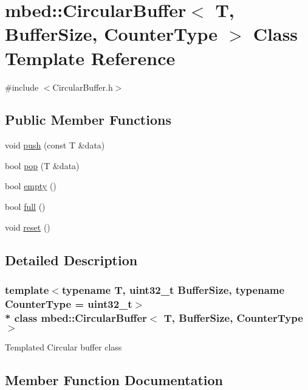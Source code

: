 \hypertarget{classmbed_1_1_circular_buffer}{}\section{mbed\+:\+:Circular\+Buffer$<$ T, Buffer\+Size, Counter\+Type $>$ Class Template Reference}
\label{classmbed_1_1_circular_buffer}


{\ttfamily \#include $<$Circular\+Buffer.\+h$>$}

\subsection*{Public Member Functions}
\begin{DoxyCompactItemize}
\item 
void \hyperlink{classmbed_1_1_circular_buffer_a7912eb5ef637aee9dec87ccc2c142027}{push} (const T \&data)
\item 
bool \hyperlink{classmbed_1_1_circular_buffer_ad3f648bd0c4c64dca2a4549eac41381c}{pop} (T \&data)
\item 
bool \hyperlink{classmbed_1_1_circular_buffer_a3d5c033b92daa3d0575702d3f0d9464d}{empty} ()
\item 
bool \hyperlink{classmbed_1_1_circular_buffer_a662aaf4fa7ef4e7aa0b9ee0d4a8e4f7a}{full} ()
\item 
void \hyperlink{classmbed_1_1_circular_buffer_aeaa832ce32a966c1605af04e988c273f}{reset} ()
\end{DoxyCompactItemize}


\subsection{Detailed Description}
\subsubsection*{template$<$typename T, uint32\+\_\+t Buffer\+Size, typename Counter\+Type = uint32\+\_\+t$>$\\*
class mbed\+::\+Circular\+Buffer$<$ T, Buffer\+Size, Counter\+Type $>$}

Templated Circular buffer class 

\subsection{Member Function Documentation}
